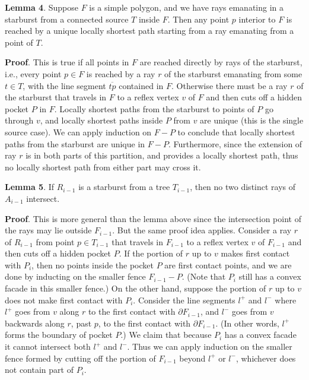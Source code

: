 \documentclass[a4paper]{article}
\begin{document}
\textbf{Lemma 4}. Suppose \(F\) is a simple polygon, and we have rays emanating in a starburst from a connected source \(T\) inside \(F\). Then any point \(p\) interior to \(F\) is reached by a unique locally shortest path starting from a ray emanating from a point of \(T\). 

\textbf{Proof}. This is true if all points in \(F\) are reached directly by rays of the starburst, i.e., every point \(p \in F\) is reached by a ray \(r\) of the starburst emanating from some \(t \in T\), with the line segment \(\overline{tp}\) contained in \(F\). Otherwise there must be a ray \(r\) of the starburst that travels in \(F\) to a reflex vertex \(v\) of \(F\) and then cuts off a hidden pocket \(P\) in \(F\). Locally shortest paths from the starburst to points of \(P\) go through \(v\), and locally shortest paths inside \(P\) from \(v\) are unique (this is the single source case). We can apply induction on \(F - P\) to conclude that locally shortest paths from the starburst are unique in \(F - P\). Furthermore, since the extension of ray \(r\) is in both parts of this partition, and provides a locally shortest path, thus no locally shortest path from either part may cross it.

\textbf{Lemma 5}. If \(R_{i - 1}\) is a starburst from a tree \(T_{i - 1}\), then no two distinct rays of \(A_{i - 1}\) intersect. 

\textbf{Proof}. This is more general than the lemma above since the intersection point of the rays may lie outside \(F_{i - 1}\). But the same proof idea applies. Consider a ray \(r\) of \(R_{i - 1}\) from point \(p \in T_{i - 1}\) that travels in \(F_{i - 1}\) to a reflex vertex \(v\) of \(F_{i - 1}\) and then cuts off a hidden pocket \(P\). If the portion of \(r\) up to \(v\) makes first contact with \(P_i\), then no points inside the pocket \(P\) are first contact points, and we are done by inducting on the smaller fence \(F_{i - 1} - P\). (Note that \(P_i\) still has a convex facade in this smaller fence.) On the other hand, suppose the portion of \(r\) up to \(v\) does not make first contact with \(P_i\). Consider the line segments \(l^+\) and \(l^-\) where \(l^+\) goes from \(v\) along \(r\) to the first contact with \(\partial F_{i - 1}\), and \(l^-\) goes from \(v\) backwards along \(r\), past \(p\), to the first contact with \(\partial F_{i - 1}\). (In other words, \(l^+\) forms the boundary of pocket \(P\).) We claim that because \(P_i\) has a convex facade it cannot intersect both \(l^+\) and \(l^-\). Thus we can apply induction on the smaller fence formed by cutting off the portion of \(F_{i - 1}\) beyond \(l^+\) or \(l^-\), whichever does not contain part of \(P_i\).
\end{document}
